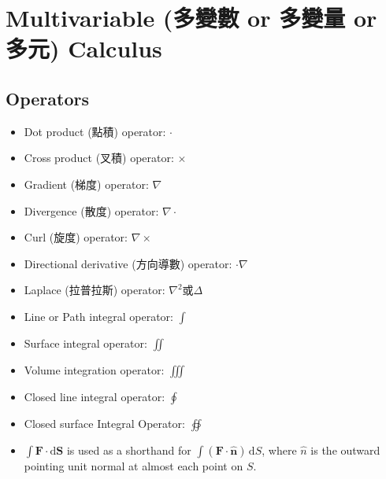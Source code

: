 \documentclass[a4paper,12pt]{report}
\begin{document}
{{{{{{{{{{{{\section{Multivariable (多變數 or 多變量 or 多元) Calculus}
\subsection{Operators}
\begin{itemize}
\item Dot product (點積) operator: $\cdot$
\item Cross product (叉積) operator: $\times$
\item Gradient (梯度) operator: $\nabla$
\item Divergence (散度) operator: $\nabla \cdot$
\item Curl (旋度) operator: $\nabla \times$
\item Directional derivative (方向導數) operator: $\cdot\nabla$
\item Laplace (拉普拉斯) operator: $\nabla^2$或$\Delta$
\item Line or Path integral operator: $\int$
\item Surface integral operator: $\iint$
\item Volume integration operator: $\iiint$
\item Closed line integral operator: $\oint$
\item Closed surface Integral Operator: $\oiint$
\item $\int\mathbf{F}\cdot\mathrm{d}\mathbf{S}$ is used as a shorthand for $\int(\mathbf{F}\cdot\mathbf{\hat{n}})\,\mathrm{d}S$, where $\hat{n}$ is the outward pointing unit normal at almost each point on $S$.
\end{itemize}
}}}}}}}}}}}}
\end{document}
